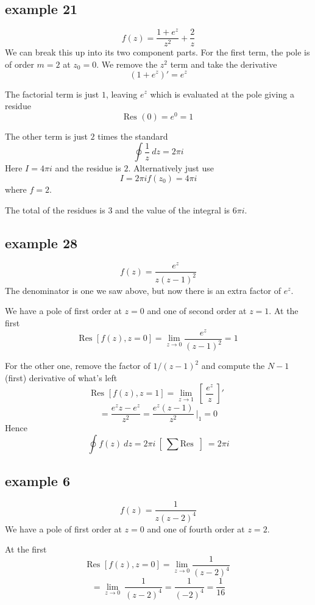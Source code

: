 \documentclass[11pt, oneside]{article}
\begin{document}
\subsection*{example 21}

\label{sec:ex21R}

\[ f(z) = \frac{1 + e^z}{z^2} + \frac{2}{z} \]
We can break this up into its two component parts.  For the first term, the pole is of order $m = 2$ at $z_0 = 0$.  We remove the $z^2$ term and take the derivative
\[ (1 + e^z)' = e^z \]

The factorial term is just $1$, leaving $e^z$ which is evaluated at the pole giving a residue
\[ \text{Res }(0) = e^0 = 1 \]

The other term is just $2$ times the standard
\[ \oint \frac{1}{z} \ dz = 2 \pi i \]
Here $I = 4 \pi i$ and the residue is $2$.  Alternatively just use
\[ I = 2 \pi i f(z_0) = 4 \pi i \]
where $f = 2$.

The total of the residues is $3$ and the value of the integral is $6 \pi i$.

\subsection*{example 28}

\label{sec:ex28R}

\[ f(z) = \frac{e^z}{z(z-1)^2} \]
The denominator is one we saw above, but now there is an extra factor of $e^z$.

We have a pole of first order at $z=0$ and one of second order at $z=1$.  At the first
\[ \text{Res } [f(z),z=0] = \lim_{z \rightarrow 0} \frac{e^z}{(z-1)^2} = 1 \]

For the other one, remove the factor of $1/(z-1)^2$ and compute the $N-1$ (first) derivative of what's left
\[ \text{Res } [f(z),z=1] = \lim_{z \rightarrow 1} \ [ \ \frac{e^z}{z} \ ]' \ \]
\[ = \frac{e^z z - e^z}{z^2} = \frac{e^z(z - 1)}{z^2} \ \bigg |_1 =  0 \]
Hence
\[ \oint f(z) \ dz = 2 \pi i \ [ \ \sum  \text{Res } \ ] \ = 2 \pi i \]

\subsection*{example 6}

\label{sec:ex6R}

\[ f(z) = \frac{1}{z(z-2)^4} \]
We have a pole of first order at $z=0$ and one of fourth order at $z=2$.  

At the first
\[ \text{Res } [f(z),z=0] = \lim_{z \rightarrow 0}   \frac{1}{(z-2)^4} \]
\[ =  \lim_{z \rightarrow 0} \ \frac{1}{(z-2)^4}  = \frac{1}{(-2)^4} =  \frac{1}{16} \]
\end{document}
